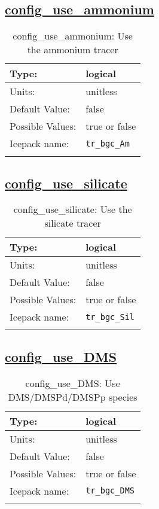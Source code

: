 \subsection[config\_use\_ammonium]{\hyperref[sec:nm_tab_biogeochemistry]{config\_use\_ammonium}}
\label{subsec:nm_sec_config_use_ammonium}
\begin{center}
\begin{longtable}{| p{2.0in} || p{4.0in} |}
    \hline
    Type: & logical \\
    \hline
    Units: & \si{unitless} \\
    \hline
    Default Value: & false \\
    \hline
    Possible Values: & true or false \\
    \hline
    Icepack name: & \verb+tr_bgc_Am+ \\
    \hline
    \caption{config\_use\_ammonium: Use the ammonium tracer}
\end{longtable}
\end{center}
\subsection[config\_use\_silicate]{\hyperref[sec:nm_tab_biogeochemistry]{config\_use\_silicate}}
\label{subsec:nm_sec_config_use_silicate}
\begin{center}
\begin{longtable}{| p{2.0in} || p{4.0in} |}
    \hline
    Type: & logical \\
    \hline
    Units: & \si{unitless} \\
    \hline
    Default Value: & false \\
    \hline
    Possible Values: & true or false \\
    \hline
    Icepack name: & \verb+tr_bgc_Sil+ \\
    \hline
    \caption{config\_use\_silicate: Use the silicate tracer}
\end{longtable}
\end{center}
\subsection[config\_use\_DMS]{\hyperref[sec:nm_tab_biogeochemistry]{config\_use\_DMS}}
\label{subsec:nm_sec_config_use_DMS}
\begin{center}
\begin{longtable}{| p{2.0in} || p{4.0in} |}
    \hline
    Type: & logical \\
    \hline
    Units: & \si{unitless} \\
    \hline
    Default Value: & false \\
    \hline
    Possible Values: & true or false \\
    \hline
    Icepack name: & \verb+tr_bgc_DMS+ \\
    \hline
    \caption{config\_use\_DMS: Use DMS/DMSPd/DMSPp species}
\end{longtable}
\end{center}
